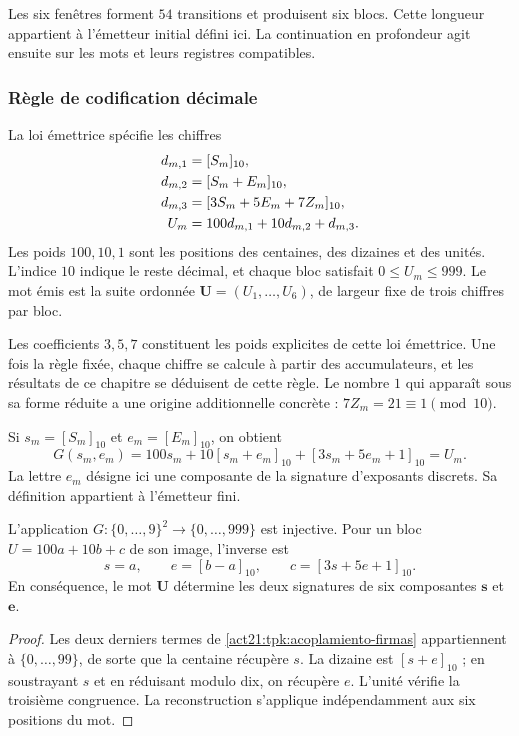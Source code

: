 Les six fenêtres forment \(54\) transitions et produisent six blocs.  
Cette longueur appartient à l'émetteur initial défini ici. La continuation  
en profondeur agit ensuite sur les mots et leurs registres compatibles.

\subsubsection{Règle de codification décimale}

La loi émettrice spécifie les chiffres
\begin{align}
 d_{m,1}&=[S_m]_{10},\notag\\
 d_{m,2}&=[S_m+E_m]_{10},\notag\\
 d_{m,3}&=[3S_m+5E_m+7Z_m]_{10},\notag\\
 U_m&=100d_{m,1}+10d_{m,2}+d_{m,3}.
 \label{act21:tpk:bloque-decimal}
\end{align}
Les poids \(100,10,1\) sont les positions des centaines, des dizaines et des unités.
L'indice \(10\) indique le reste décimal, et chaque bloc satisfait
\(0\leq U_m\leq999\). Le mot émis est la suite ordonnée
\(\mathbf U=(U_1,\ldots,U_6)\), de largeur fixe de trois chiffres par bloc.

Les coefficients \(3,5,7\) constituent les poids explicites de cette loi
émettrice. Une fois la règle fixée, chaque chiffre se calcule à partir des
accumulateurs, et les résultats de ce chapitre se déduisent de cette règle.
Le nombre \(1\) qui apparaît sous sa forme réduite a une origine
additionnelle concrète : \(7Z_m=21\equiv1\pmod{10}\).

Si \(s_m=[S_m]_{10}\) et \(e_m=[E_m]_{10}\), on obtient
\begin{equation}
 G(s_m,e_m)=100s_m+10[s_m+e_m]_{10}
                   +[3s_m+5e_m+1]_{10}=U_m.
 \label{act21:tpk:acoplamiento-firmas}
\end{equation}
La lettre \(e_m\) désigne ici une composante de la signature d'exposants discrets. Sa définition appartient à l'émetteur fini.

\begin{proposition}
\label{act21:tpk:recuperacion-firmas}
L'application \(G:\{0,\ldots,9\}^2\to\{0,\ldots,999\}\) est injective.
Pour un bloc \(U=100a+10b+c\) de son image, l'inverse est
\[
 s=a,\qquad e=[b-a]_{10},\qquad
 c=[3s+5e+1]_{10}.
\]
En conséquence, le mot \(\mathbf U\) détermine les deux signatures de six composantes \(\mathbf s\) et \(\mathbf e\).
\end{proposition}
\begin{proof}
Les deux derniers termes de \eqref{act21:tpk:acoplamiento-firmas} appartiennent à
\(\{0,\ldots,99\}\), de sorte que la centaine récupère \(s\). La dizaine
est \([s+e]_{10}\) ; en soustrayant \(s\) et en réduisant modulo dix, on récupère
\(e\). L'unité vérifie la troisième congruence. La reconstruction s'applique
indépendamment aux six positions du mot.
\end{proof}

